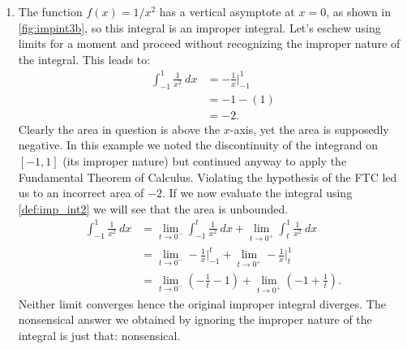 \begin{example}
\begin{enumerate}
\item		The function $f(x) = 1/x^2$ has a vertical asymptote at $x=0$, as shown in \autoref{fig:impint3b}, so this integral is an improper integral. Let's eschew using limits for a moment and proceed without recognizing the improper nature of the integral. This leads to:
\begin{align*}
\int_{-1}^1\frac1{x^2}\ dx &= -\frac1x\Big|_{-1}^1\\
			&= -1 - (1)\\
			&=-2.
\end{align*}
%
%
Clearly the area in question is above the $x$-axis, yet the area is supposedly negative. In this example we noted the discontinuity of the integrand on $[-1,1]$ (its improper nature) but continued anyway to apply the Fundamental Theorem of Calculus. Violating the hypothesis of the FTC led us to an incorrect area of $-2$. If we now evaluate the integral using \autoref{def:imp_int2} we will see that the area is unbounded.
\begin{align*}
	\int_{-1}^1\frac1{x^2}\ dx
	&= \lim_{t\to0^-}\int_{-1}^t \frac1{x^2}\ dx + \lim_{t\to0^+}\int_t^1\frac1{x^2}\ dx \\
	&= \lim_{t\to0^-}-\frac1x\Big|_{-1}^t + \lim_{t\to0^+}-\frac1x\Big|_t^1\\
	&= \lim_{t\to0^-}\left(-\frac1t-1\right) + \lim_{t\to0^+}\left(-1+\frac1t\right).
\end{align*}
Neither limit converges hence the original improper integral diverges. The nonsensical answer we obtained by ignoring the improper nature of the integral is just that: nonsensical.
\end{enumerate}
\end{example}

